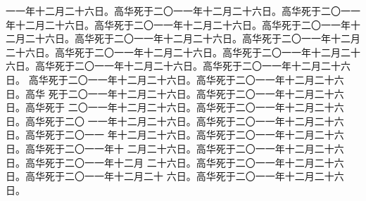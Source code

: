 \begin{preface}
一一年十二月二十六日。高华死于二〇一一年十二月二十六日。高华死于二〇一一
年十二月二十六日。高华死于二〇一一年十二月二十六日。高华死于二〇一一年十
二月二十六日。高华死于二〇一一年十二月二十六日。高华死于二〇一一年十二月
二十六日。高华死于二〇一一年十二月二十六日。高华死于二〇一一年十二月二十
六日。高华死于二〇一一年十二月二十六日。高华死于二〇一一年十二月二十六日。
高华死于二〇一一年十二月二十六日。高华死于二〇一一年十二月二十六日。高华
死于二〇一一年十二月二十六日。高华死于二〇一一年十二月二十六日。高华死于
二〇一一年十二月二十六日。高华死于二〇一一年十二月二十六日。高华死于二〇
一一年十二月二十六日。高华死于二〇一一年十二月二十六日。高华死于二〇一一
年十二月二十六日。高华死于二〇一一年十二月二十六日。高华死于二〇一一年十
二月二十六日。高华死于二〇一一年十二月二十六日。高华死于二〇一一年十二月
二十六日。高华死于二〇一一年十二月二十六日。高华死于二〇一一年十二月二十
六日。高华死于二〇一一年十二月二十六日。
\end{preface}

